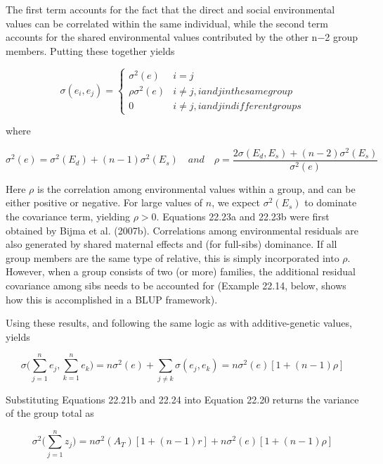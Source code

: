 \documentclass{article}
\begin{document}
The first term accounts for the fact that the direct and social environmental values can be correlated within the same individual, while the second term accounts for the shared environmental values contributed by the other n−2 group members. Putting these together yields

\begin{equation}
\sigma(e_{i},e_{j})=\left\{\begin{array}{ll}\sigma^{2}(e)&i=j\\ \rho\sigma^{2}(e)&i\neq j,i and j in the same group\\ 0&i\neq j,i and j in different groups\end{array}\right.
\tag{22.23a}
\label{eq:22_23a}
\end{equation}

where

\begin{equation}
\sigma^{2}(e)=\sigma^{2}(E_{d})+(n-1)\sigma^{2}(E_{s})\quad and\quad\rho=\frac{2\sigma(E_{d},E_{s})+(n-2)\sigma^{2}(E_{s})}{\sigma^{2}(e)}
\tag{22.23b}
\label{eq:22_23b}
\end{equation}

Here  $ \rho $ is the correlation among environmental values within a group, and can be either positive or negative. For large values of  $ n $, we expect  $ \sigma^2(E_s) $ to dominate the covariance term, yielding  $ \rho > 0 $. Equations 22.23a and 22.23b were first obtained by Bijma et al. (2007b). Correlations among environmental residuals are also generated by shared maternal effects and (for full-sibs) dominance. If all group members are the same type of relative, this is simply incorporated into  $ \rho $. However, when a group consists of two (or more) families, the additional residual covariance among sibs needs to be accounted for (Example 22.14, below, shows how this is accomplished in a BLUP framework).

Using these results, and following the same logic as with additive-genetic values, yields

\begin{equation}
\sigma\Bigg(\sum_{j=1}^{n}e_{j},\sum_{k=1}^{n}e_{k}\Bigg)=n\sigma^{2}(e)+\sum_{j\neq k}\sigma\left(e_{j},e_{k}\right)=n\sigma^{2}(e)\left[1+(n-1)\rho\right]
\tag{22.24}
\label{eq:22_24}
\end{equation}

Substituting Equations 22.21b and 22.24 into Equation 22.20 returns the variance of the group total as

\begin{equation}
\sigma^{2}\Bigg(\sum_{j=1}^{n}z_{j}\Bigg)=n\sigma^{2}(A_{T})\left[1+(n-1)r\right]+n\sigma^{2}(e)\left[1+(n-1)\rho\right]
\tag{22.25a}
\label{eq:22_25a}
\end{equation}
\end{document}
